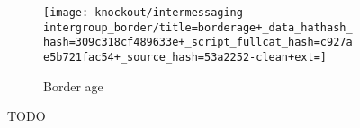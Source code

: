 \begin{figure*}[!htbp]
\begin{center}
\begin{minipage}[t]{\columnwidth}
\vspace{1ex}

\hspace*{\fill}%
\begin{minipage}[t]{\columnwidth}
\centering
\vspace{0pt} %
\begin{subfigure}[b]{\textwidth}
\texttt{[image: knockout/intermessaging-intergroup\_border/title=borderage+\_data\_hathash\_hash=309c318cf489633e+\_script\_fullcat\_hash=c927ae5b721fac54+\_source\_hash=53a2252-clean+ext=]}%
\caption{Border age}
\label{fig:TODO}
\end{subfigure}
\end{minipage}%
\hspace*{\fill}
\end{minipage}

\caption{
TODO
}
\label{fig:ko-apoptosis}
\end{center}
\end{figure*}
